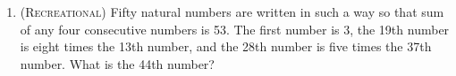 \begin{enumerate}
    \item (\textsc{Recreational}) \label{ex:rec}
        Fifty natural numbers are written in such a way 
        so that sum of any four consecutive numbers is 53. 
        The first number is 3, the 19th number is eight times the 13th number, 
        and the 28th number is five times the 37th number. 
        What is the 44th number?

\end{enumerate}



